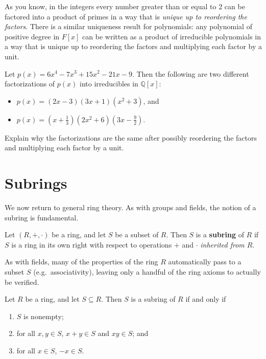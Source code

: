 As you know, in the integers every number greater than or equal to $2$ can be factored into a product of primes in a way that is \emph{unique up to reordering the factors}. There is a similar uniqueness result for polynomials: any polynomial of positive degree in $F[x]$ can be written as a product of irreducible polynomials in a way that is unique up to reordering the factors and multiplying each factor by a unit.

\begin{problem}
Let $p(x) = 6 x^4 - 7 x^3 + 15 x^2 - 21 x - 9$. Then the following are two different factorizations of $p(x)$ into irreducibles in $\mathbb{Q}[x]$:
\begin{itemize}
\item $p(x) = (2x-3)(3x+1)(x^2+3)$, and
\item $p(x) = (x+\frac{1}{3})(2x^2+6)(3x-\frac{9}{2})$.
\end{itemize}
 Explain why the factorizations are the same after possibly reordering the factors and multiplying each factor by a unit.
\end{problem}

\section{Subrings}
We now return to general ring theory. As with groups and fields, the notion of a subring is fundamental. 

\begin{definition}
Let $(R,+,\cdot)$ be a ring, and let $S$ be a subset of $R$. Then $S$ is a \textbf{subring} of $R$ if $S$ is a ring in its own right with respect to operations $+$ and $\cdot$ \emph{inherited from $R$}.
\end{definition}

As with fields, many of the properties of the ring $R$ automatically pass to a subset $S$ (e.g.~associativity), leaving only a handful of the ring axioms to actually be verified.

\begin{theorem}
Let $R$ be a ring, and let $S\subseteq R$. Then $S$ is a subring of $R$ if and only if 
\begin{enumerate}
\item $S$ is nonempty;
\item for all $x,y\in S$, $x+y\in S$ and  $xy\in S$; and
\item for all $x\in S$, $-x\in S$.
\end{enumerate}
\end{theorem}

